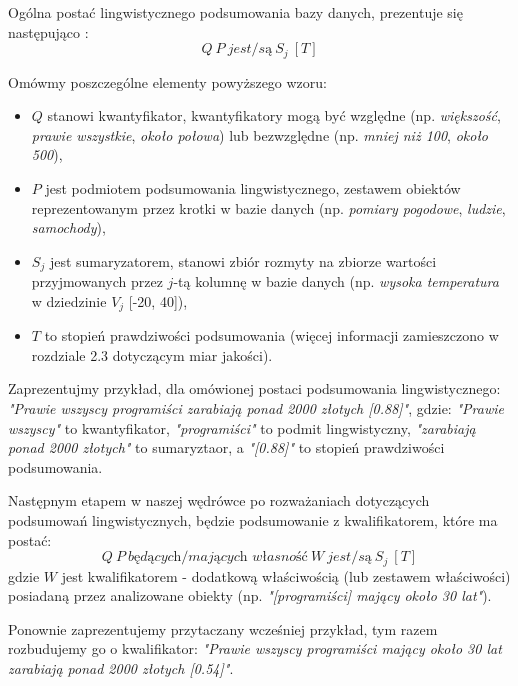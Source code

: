 \documentclass{classrep}
\begin{document}
Ogólna postać lingwistycznego podsumowania bazy danych, prezentuje się następująco \cite{ksiazka}:
\begin{equation}
Q  ~ P  ~ { \textit{jest/są} }  ~ S_j ~[T]
\end{equation}

Omówmy poszczególne elementy powyższego wzoru:
\begin{itemize}[label=$\bullet$\scshape\bfseries]
\item $Q$ stanowi kwantyfikator, kwantyfikatory mogą być względne (np. \textit{większość}, \textit{prawie wszystkie}, \textit{około połowa}) lub bezwzględne (np. \textit{mniej niż 100}, \textit{około 500}),
\item $P$ jest podmiotem podsumowania lingwistycznego, zestawem obiektów reprezentowanym przez krotki w bazie danych (np. \textit{pomiary pogodowe},  \textit{ludzie},  \textit{samochody}),
\item $S_j$ jest sumaryzatorem, stanowi zbiór rozmyty na zbiorze wartości przyjmowanych przez $j$-tą kolumnę w bazie danych (np. \textit{wysoka temperatura} w dziedzinie $V_j$ [-20, 40]),
\item $T$ to stopień prawdziwości podsumowania (więcej informacji zamieszczono w rozdziale 2.3 dotyczącym miar jakości).
\end{itemize}

Zaprezentujmy przykład, dla omówionej postaci podsumowania lingwistycznego: \textit{"Prawie wszyscy programiści zarabiają ponad 2000 złotych [0.88]"}, gdzie:  \textit{"Prawie wszyscy"} to kwantyfikator,  \textit{"programiści"} to podmit lingwistyczny, \textit{"zarabiają ponad 2000 złotych"} to sumaryztaor, a  \textit{"[0.88]"} to stopień prawdziwości podsumowania. \newline


Następnym etapem w naszej wędrówce po rozważaniach dotyczących podsumowań lingwistycznych, będzie podsumowanie z kwalifikatorem, które ma postać:
\begin{equation}
Q  ~ P ~ \textit{będących/mających własność} ~ W  ~ { \textit{jest/są} }  ~ S_j ~[T]
\end{equation}
gdzie $W$ jest kwalifikatorem - dodatkową właściwością (lub zestawem właściwości) posiadaną przez analizowane obiekty (np. \textit{"[programiści] mający około 30 lat"}).\newline

Ponownie zaprezentujemy przytaczany wcześniej przykład, tym razem rozbudujemy go o kwalifikator: \textit{"Prawie wszyscy programiści mający około 30 lat zarabiają ponad 2000 złotych [0.54]"}.\newline
\end{document}
